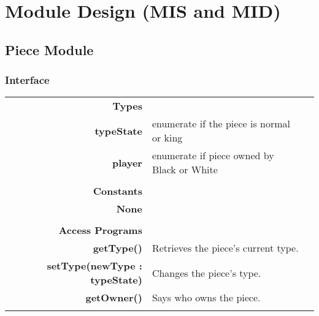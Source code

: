 \documentclass[10pt]{article}
\makeatletter
\newcommand{\CustomLabel}[1]{\Hy@raisedlink{\hypertarget{#1}{}}\label{#1}}
\makeatother
\begin{document}
\newpage



\section{Module Design (MIS and MID)}


        
        
    \subsection{Piece Module}\CustomLabel{mis:Piece}
    \subsubsection{Interface}
        \begin{tabularx}{\linewidth}{@{} >{\bfseries}r Xp{5cm} }
            Types           & \begin{tabular}[t]{@{} l p{8cm}} 
                                     & \\
                                    typeState & enumerate if the piece is normal or king \\
                                    player & enumerate if piece owned by Black or White \\
                              \end{tabular} \\
                              
            Constants       & \begin{tabular}[t]{@{} l p{8cm}} 
                                     & \\
                                    None & \\
                              \end{tabular} \\

            Access Programs & \begin{tabular}[t]{@{} l p{8cm}}
                                     & \\
                                    getType() & Retrieves the piece's current type. \\
                                    setType(newType : typeState) & Changes the piece's type. \\ 
                                    getOwner() & Says who owns the piece. \\
                              \end{tabular}
        \end{tabularx}
        
\end{document}
